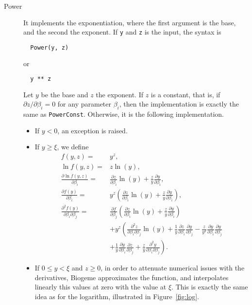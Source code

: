 \documentclass[12pt,a4paper]{article}
\begin{document}
\begin{description}
\item[Power] It implements the exponentiation, where the first argument is the base, and the second the exponent. 
    If \lstinline+y+ and \lstinline+z+ is the input, the syntax is
\begin{lstlisting}
  Power(y, z)
\end{lstlisting}
or
\begin{lstlisting}
  y ** z
\end{lstlisting}
Let $y$ be the base and $z$ the exponent.
If $z$ is a constant, that is, if $\partial z/\partial \beta_i=0$ for any parameter $\beta_i$, then the implementation is exactly the same as \lstinline+PowerConst+. Otherwise, it is the following implementation.
\begin{itemize}
\item If $y < 0$, an exception is raised.
\item If $y \geq \xi$, we define
      \begin{align*}
    f(y, z)=& y^z, \\ 
    \ln f(y, z) =& z \ln(y), \\
    \frac{\partial \ln f(y, z)}{\partial \beta_i} =& \frac{\partial z}{\partial \beta_i} \ln(y) + \frac{z}{y} \frac{\partial y}{\partial \beta_i}, \\
    \frac{\partial f(y)}{\partial \beta_i} =& y^z \left(\frac{\partial z}{\partial \beta_i} \ln(y) + \frac{z}{y} \frac{\partial y}{\partial \beta_i}\right), \\
    \frac{\partial^2 f(y)}{\partial \beta_i \partial \beta_j} =& \frac{\partial f}{\partial \beta_j} \left(\frac{\partial z}{\partial \beta_i} \ln(y) + \frac{z}{y} \frac{\partial y}{\partial \beta_i}\right) \\
    & +y^z \left(
    \frac{\partial^2 z}{\partial \beta_i \partial \beta_j}\ln(y)
    + \frac{1}{y}\frac{\partial z}{\partial \beta_i}\frac{\partial y}{\partial \beta_j}
    - \frac{z}{y^2}\frac{\partial y}{\partial \beta_i}\frac{\partial y}{\partial \beta_j}\right.\\
    &\left.
    +\frac{1}{y}\frac{\partial y}{\partial \beta_i}\frac{\partial z}{\partial \beta_j}
    +\frac{z}{y}\frac{\partial^2 y}{\partial \beta_i\partial \beta_j}
    \right).
     \end{align*}
\item If $0 \leq y < \xi$ and $z \geq 0$, in order to attenuate numerical issues with the derivatives, Biogeme approximates the function, and interpolates linearly this values at zero with the value at  $\xi$.
  This is exactly the same idea as for the logarithm,  illustrated in Figure~\vref{fig:log}.
  

\end{itemize}
\end{description}
\end{document}
